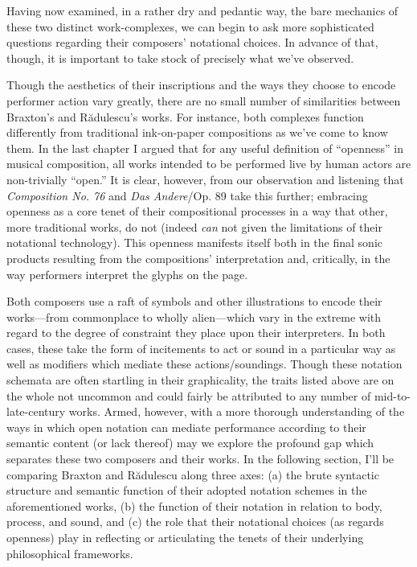         Having now examined, in a rather dry and pedantic way, the bare mechanics of these two distinct work-complexes, we can begin to ask more sophisticated questions regarding their composers' notational choices. In advance of that, though, it is important to take stock of precisely what we've observed. 
    
        Though the aesthetics of their inscriptions and the ways they choose to encode performer action vary greatly, there are no small number of similarities between Braxton's and R\u{a}dulescu's works. For instance, both complexes function differently from traditional ink-on-paper compositions as we've come to know them. In the last chapter I argued that for any useful definition of ``openness'' in musical composition, all works intended to be performed live by human actors are non-trivially ``open.'' It is clear, however, from our observation and listening that \textit{Composition No. 76} and \textit{Das Andere}/Op. 89 take this further; embracing openness as a core tenet of their compositional processes in a way that other, more traditional works, do not (indeed \textit{can} not given the limitations of their notational technology). This openness manifests itself both in the final sonic products resulting from the compositions' interpretation and, critically, in the way performers interpret the glyphs on the page.
        
        Both composers use a raft of symbols and other illustrations to encode their works---from commonplace to wholly alien---which vary in the extreme with regard to the degree of constraint they place upon their interpreters. In both cases, these take the form of incitements to act or sound in a particular way as well as modifiers which mediate these actions/soundings. Though these notation schemata are often startling in their graphicality, the traits listed above are on the whole not uncommon and could fairly be attributed to any number of mid-to-late-century works. Armed, however, with a more thorough understanding of the ways in which open notation can mediate performance according to their semantic content (or lack thereof) may we explore the profound gap which separates these two composers and their works. In the following section, I'll be comparing Braxton and R\u{a}dulescu along three axes: (a) the brute syntactic structure and semantic function of their adopted notation schemes in the aforementioned works, (b) the function of their notation in relation to body, process, and sound, and (c) the role that their notational choices (as regards openness) play in reflecting or articulating the tenets of their underlying philosophical frameworks.

